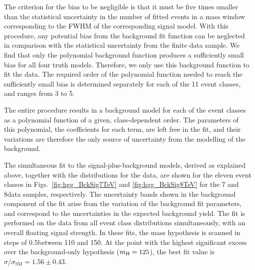 \documentclass[11pt,twoside,a4paper,cmspaper,final,collab]{cms-tdr}
\begin{document}
The criterion for the bias to be negligible is that it must be
five times smaller than the statistical uncertainty in the number of fitted events
in a mass window corresponding to the FWHM of the corresponding signal model.
With this procedure, any potential bias from the background fit function can be neglected in comparison with the statistical
uncertainty from the finite data sample. We find that only the polynomial background function produces a
sufficiently small bias for all four truth models. Therefore, we only use this background function to fit the data.
The required order of the polynomial function needed to reach the sufficiently small bias is determined separately for each
of the 11 event classes, and ranges from 3 to 5.

The entire procedure results in a background model for each of the event classes as a polynomial function
of a given, class-dependent order. The parameters of this polynomial, \ie the coefficients for each term,
are left free in the fit, and their variations are therefore the only source of uncertainty
from the modelling of the background.

The simultaneous fit to the signal-plus-background models, derived as explained above,
together with the \mgg distributions for the data, are shown
for the eleven event classes in Figs.~\ref{fig:hgg_BckSig7TeV} and \ref{fig:hgg_BckSig8TeV}
for the 7 and  8\TeV data samples, respectively.
The uncertainty bands shown in the background component of the fit arise from the
variation of the background fit parameters, and correspond to the uncertainties
in the expected background yield.
The fit is performed on the data from all event class distributions simultaneously, with an overall floating signal strength.
In these fits, the mass hypothesis is scanned in steps of 0.5\GeV between 110 and 150\GeV. At the
point with the highest significant excess over the background-only hypothesis ($m_{\mathrm{H}}=125$\GeV),
the best fit value is $\sigma/\sigma_\mathrm{SM}=1.56\pm0.43$.
\end{document}
